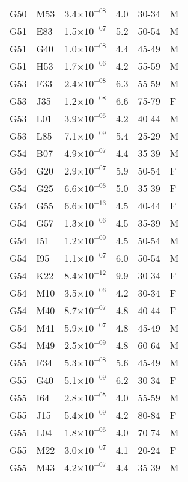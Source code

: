 \begin{longtable}{lllrll}
   G50 & M53 & 3.4$\times10^{-08}$ & 4.0 & 30-34 & M \\ 
   G51 & E83 & 1.5$\times10^{-07}$ & 5.2 & 50-54 & M \\ 
   G51 & G40 & 1.0$\times10^{-08}$ & 4.4 & 45-49 & M \\ 
   G51 & H53 & 1.7$\times10^{-06}$ & 4.2 & 55-59 & M \\ 
   G53 & F33 & 2.4$\times10^{-08}$ & 6.3 & 55-59 & M \\ 
   G53 & J35 & 1.2$\times10^{-08}$ & 6.6 & 75-79 & F \\ 
   G53 & L01 & 3.9$\times10^{-06}$ & 4.2 & 40-44 & M \\ 
   G53 & L85 & 7.1$\times10^{-09}$ & 5.4 & 25-29 & M \\ 
   G54 & B07 & 4.9$\times10^{-07}$ & 4.4 & 35-39 & M \\ 
   G54 & G20 & 2.9$\times10^{-07}$ & 5.9 & 50-54 & F \\ 
   G54 & G25 & 6.6$\times10^{-08}$ & 5.0 & 35-39 & F \\ 
   G54 & G55 & 6.6$\times10^{-13}$ & 4.5 & 40-44 & F \\ 
   G54 & G57 & 1.3$\times10^{-06}$ & 4.5 & 35-39 & M \\ 
   G54 & I51 & 1.2$\times10^{-09}$ & 4.5 & 50-54 & M \\ 
   G54 & I95 & 1.1$\times10^{-07}$ & 6.0 & 50-54 & M \\ 
   G54 & K22 & 8.4$\times10^{-12}$ & 9.9 & 30-34 & F \\ 
   G54 & M10 & 3.5$\times10^{-06}$ & 4.2 & 30-34 & F \\ 
   G54 & M40 & 8.7$\times10^{-07}$ & 4.8 & 40-44 & F \\ 
   G54 & M41 & 5.9$\times10^{-07}$ & 4.8 & 45-49 & M \\ 
   G54 & M49 & 2.5$\times10^{-09}$ & 4.8 & 60-64 & M \\ 
   G55 & F34 & 5.3$\times10^{-08}$ & 5.6 & 45-49 & M \\ 
   G55 & G40 & 5.1$\times10^{-09}$ & 6.2 & 30-34 & F \\ 
   G55 & I64 & 2.8$\times10^{-05}$ & 4.0 & 55-59 & M \\ 
   G55 & J15 & 5.4$\times10^{-09}$ & 4.2 & 80-84 & F \\ 
   G55 & L04 & 1.8$\times10^{-06}$ & 4.0 & 70-74 & M \\ 
   G55 & M22 & 3.0$\times10^{-07}$ & 4.1 & 20-24 & F \\ 
   G55 & M43 & 4.2$\times10^{-07}$ & 4.4 & 35-39 & M \\ 

\end{longtable}

